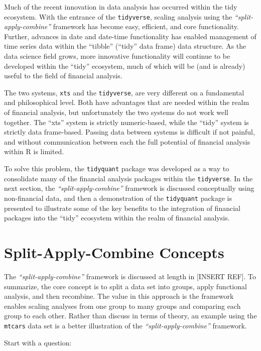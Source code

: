 Much of the recent innovation in data analysis has occurred within the
tidy ecosystem. With the entrance of the \texttt{tidyverse}, scaling
analysis using the \emph{``split-apply-combine''} framework has become
easy, efficient, and core functionality. Further, advances in date and
date-time functionality has enabled management of time series data
within the ``tibble'' (``tidy'' data frame) data structure. As the data
science field grows, more innovative functionality will continue to be
developed within the ``tidy'' ecosystem, much of which will be (and is
already) useful to the field of financial analysis.

The two systems, \texttt{xts} and the \texttt{tidyverse}, are very
different on a fundamental and philosophical level. Both have advantages
that are needed within the realm of financial analysis, but
unfortunately the two systems do not work well together. The ``xts''
system is strictly numeric-based, while the ``tidy'' system is strictly
data frame-based. Passing data between systems is difficult if not
painful, and without communication between each the full potential of
financial analysis within R is limited.

To solve this problem, the \texttt{tidyquant} package was developed as a
way to consolidate many of the financial analysis packages within the
\texttt{tidyverse}. In the next section, the
\emph{``split-apply-combine''} framework is discussed conceptually using
non-financial data, and then a demonstration of the \texttt{tidyquant}
package is presented to illustrate some of the key benefits to the
integration of financial packages into the ``tidy'' ecosystem within the
realm of financial analysis.

\section{Split-Apply-Combine
Concepts}\label{split-apply-combine-concepts}

The \emph{``split-apply-combine''} framework is discussed at length in
{[}INSERT REF{]}. To summarize, the core concept is to split a data set
into groups, apply functional analysis, and then recombine. The value in
this approach is the framework enables scaling analyses from one group
to many groups and comparing each group to each other. Rather than
discuss in terms of theory, an example using the \texttt{mtcars} data
set is a better illustration of the \emph{``split-apply-combine''}
framework.

Start with a question:

